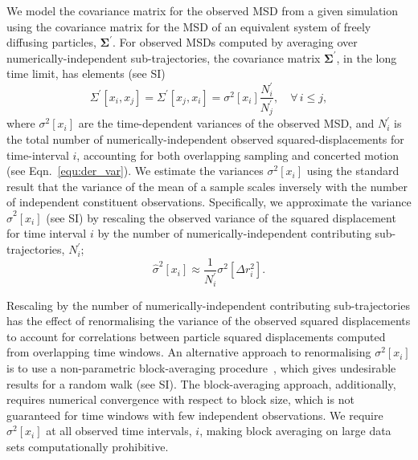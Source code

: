 \documentclass[reprint,superscriptaddress,nobibnotes,amsmath,amssymb,aps,prx,hidelinks,linenumbers]{revtex4-2}
\newcommand{\oMSDi}{\ensuremath{x_i}}
\newcommand{\oMSDj}{\ensuremath{x_j}}
\newcommand{\nind}[1]{\ensuremath{N^\prime_{#1}}}
\newcommand{\var}[1]{\ensuremath{\sigma^2[#1]}}
\newcommand{\varest}[1]{\ensuremath{\widehat{\sigma}^2[#1]}}
\begin{document}
We model the covariance matrix for the observed MSD from a given simulation using the covariance matrix for the MSD of an equivalent system of freely diffusing particles, $\mathbf{\Sigma^\prime}$.
For observed MSDs computed by averaging over numerically-independent sub-trajectories, the covariance matrix $\mathbf{\Sigma^\prime}$, in the long time limit, has elements (see SI)
%
\begin{equation}
  \Sigma^\prime\left[\oMSDi, \oMSDj\right]= \Sigma^\prime\left[\oMSDj, \oMSDi\right] =
  \var{\oMSDi} \frac{\nind{i}}{\nind{j}},\hspace{1em} \forall\,i \leq j,
  \label{equ:cvv}
\end{equation} 
%
where $\var{\oMSDi}$ are the time-dependent variances of the observed MSD, and $\nind{i}$ is the total number of numerically-independent observed squared-displacements for time-interval $i$, accounting for both overlapping sampling and concerted motion (see Eqn.~\ref{equ:der_var}).
We estimate the variances $\var{\oMSDi}$ using the standard result that the variance of the mean of a sample scales inversely with the number of independent constituent observations.
Specifically, we approximate the variance $\varest{\oMSDi}$ (see SI) by rescaling the observed variance of the squared displacement for time interval $i$ by the number of numerically-independent contributing sub-trajectories, $\nind{i}$;
%
\begin{equation}
  \varest{\oMSDi} \approx \frac{1}{\nind{i}}\var{\Delta r_i^2}.
  \label{equ:varestMSD}
\end{equation}
%

Rescaling by the number of numerically-independent contributing sub-trajectories has the effect of renormalising the variance of the observed squared displacements to account for correlations between particle squared displacements computed from overlapping time windows. 
An alternative approach to renormalising $\var{x_i}$ is to use a non-parametric block-averaging procedure~\cite{flyvbjerg_error_1989,frenkel_understanding_2023,materzanini_high_2021}, which gives undesirable results for a random walk (see SI). 
The block-averaging approach, additionally, requires numerical convergence with respect to block size, which is not guaranteed for time windows with few independent observations. 
We require $\var{x_i}$ at all observed time intervals, $i$, making block averaging on large data sets computationally prohibitive. 
\end{document}
